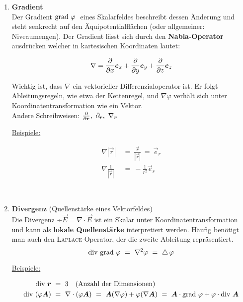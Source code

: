 \begin{enumerate}
\item \textbf{Gradient}\\

Der Gradient $\text{grad }\varphi\ $ eines Skalarfeldes beschreibt dessen Änderung und steht senkrecht auf den Äquipotentialflächen (oder allgemeiner: Niveaumengen). Der Gradient lässt sich durch den \textbf{Nabla-Operator} ausdrücken welcher in kartesischen Koordinaten lautet:
 
\begin{equation*}
\nabla=\frac{\partial{}}{\partial{x}}\bm{e}_x+\frac{\partial{}}{\partial{y}}\bm{e}_y+\frac{\partial{}}{\partial{z}}\bm{e}_z
\end{equation*}

Wichtig ist, dass $\nabla$ ein vektorieller Differenzialoperator ist. Er folgt Ableitungsregeln, wie etwa der Kettenregel, und $\nabla\varphi$ verhält sich unter Koordinatentransformation wie ein Vektor.\\
\linebreak
Andere Schreibweisen: $\pdiff{}{\vec{r}},\ \partial_{\vec{r}},\ \nabla_{\vec{r}}$\\
\linebreak

\underline{Beispiele:}

\begin{align*}
\nabla |\vec{r}|  \ &= \ \frac{\vec{r}}{|\vec{r}|} \ = \ \vec{e}_r\\
\nabla \frac{1}{|\vec{r}|} \ &= \ -\frac{1}{r^2}\vec{e}_r
\end{align*}

\ \\
\item \textbf{Divergenz} (Quellenstärke eines Vektorfeldes)\\

Die Divergenz $\div\vec{E}=\nabla\cdot\vec{E}$ ist ein Skalar unter Koordinatentransformation und kann als \textbf{lokale Quellenstärke} interpretiert werden. Häufig benötigt man auch den \textsc{Laplace}-Operator, der die zweite Ableitung repräsentiert.\\

\begin{equation*}
\text{div }\text{grad } \varphi \ = \ \nabla^2\varphi \ = \ \mathop{{}\bigtriangleup}\nolimits\varphi
\end{equation*}

\underline{Beispiele:}

\begin{align*}
\div\vec{r}\ &= \ 3 \quad\text{(Anzahl der Dimensionen)}\\
\div(\varphi\vec{A}) \ &= \ \nabla\cdot(\varphi\vec{A}) \ = \ \vec{A}(\nabla\varphi)+\varphi(\nabla\vec{A}) \ = \ \vec{A}\cdot\grad \varphi+\varphi\cdot\div\vec{A}
\end{align*}


\end{enumerate}

